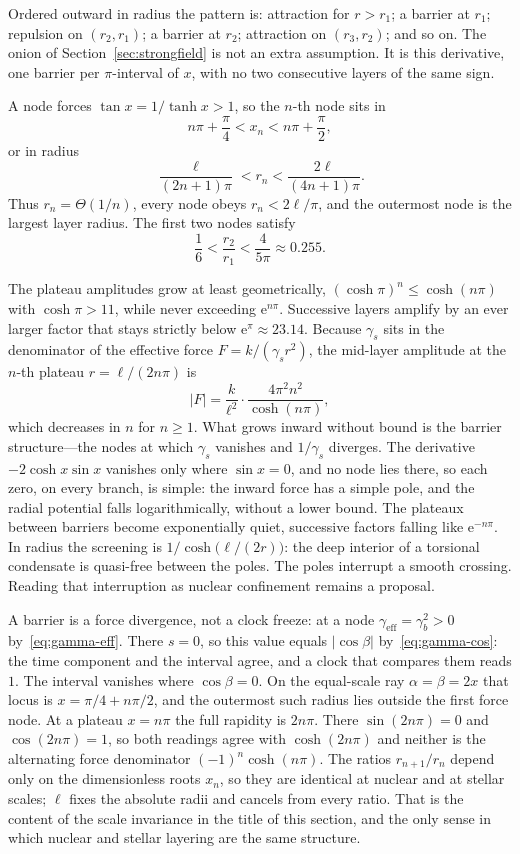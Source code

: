 \documentclass[a4paper]{article}
\begin{document}
Ordered outward in radius the pattern is: attraction for \(r>r_1\); a barrier at \(r_1\); repulsion on \((r_2,r_1)\); a barrier at \(r_2\); attraction on \((r_3,r_2)\); and so on. The onion of Section~\ref{sec:strongfield} is not an extra assumption. It is this derivative, one barrier per \(\pi\)-interval of \(x\), with no two consecutive layers of the same sign.

A node forces \(\tan x=1/\tanh x>1\), so the \(n\)-th node sits in
\[
n\pi+\frac{\pi}{4}<x_n<n\pi+\frac{\pi}{2},
\]
or in radius
\[
\frac{\ell}{(2n+1)\pi}<r_n<\frac{2\ell}{(4n+1)\pi}.
\]
Thus \(r_n=\Theta(1/n)\), every node obeys \(r_n<2\ell/\pi\), and the outermost node is the largest layer radius. The first two nodes satisfy
\[
\frac16<\frac{r_2}{r_1}<\frac{4}{5\pi}\approx 0.255.
\]

The plateau amplitudes grow at least geometrically, \((\cosh\pi)^n\le\cosh(n\pi)\) with \(\cosh\pi>11\), while never exceeding \(\mathrm{e}^{n\pi}\). Successive layers amplify by an ever larger factor that stays strictly below \(\mathrm{e}^\pi\approx 23.14\). Because \(\gamma_s\) sits in the denominator of the effective force \(F=k/(\gamma_s r^2)\), the mid-layer amplitude at the \(n\)-th plateau \(r=\ell/(2n\pi)\) is
\[
|F|=\frac{k}{\ell^2}\cdot\frac{4\pi^2n^2}{\cosh(n\pi)},
\]
which decreases in \(n\) for \(n\ge 1\). What grows inward without bound is the barrier structure---the nodes at which \(\gamma_s\) vanishes and \(1/\gamma_s\) diverges. The derivative \(-2\cosh x\sin x\) vanishes only where \(\sin x=0\), and no node lies there, so each zero, on every branch, is simple: the inward force has a simple pole, and the radial potential falls logarithmically, without a lower bound. The plateaux between barriers become exponentially quiet, successive factors falling like \(\mathrm{e}^{-n\pi}\). In radius the screening is \(1/\cosh\bigl(\ell/(2r)\bigr)\): the deep interior of a torsional condensate is quasi-free between the poles. The poles interrupt a smooth crossing. Reading that interruption as nuclear confinement remains a proposal.

A barrier is a force divergence, not a clock freeze: at a node \(\gamma_{\mathrm{eff}}=\gamma_b^2>0\) by~\eqref{eq:gamma-eff}. There \(s=0\), so this value equals \(|\cos\beta|\) by~\eqref{eq:gamma-cos}: the time component and the interval agree, and a clock that compares them reads \(1\). The interval vanishes where \(\cos\beta=0\). On the equal-scale ray \(\alpha=\beta=2x\) that locus is \(x=\pi/4+n\pi/2\), and the outermost such radius lies outside the first force node. At a plateau \(x=n\pi\) the full rapidity is \(2n\pi\). There \(\sin(2n\pi)=0\) and \(\cos(2n\pi)=1\), so both readings agree with \(\cosh(2n\pi)\) and neither is the alternating force denominator \((-1)^n\cosh(n\pi)\). The ratios \(r_{n+1}/r_n\) depend only on the dimensionless roots \(x_n\), so they are identical at nuclear and at stellar scales; \(\ell\) fixes the absolute radii and cancels from every ratio. That is the content of the scale invariance in the title of this section, and the only sense in which nuclear and stellar layering are the same structure.
\end{document}
